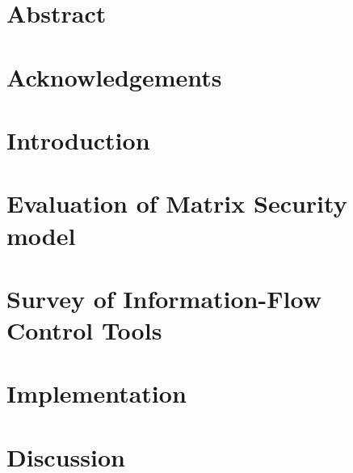




%




\setcounter{secnumdepth}{-1}
\frontmatter{}

\chapter{Abstract}


\chapter{Acknowledgements}


\pagebreak


\setcounter{tocdepth}{3}
\setcounter{secnumdepth}{3}

\tableofcontents*
\listoffigures
\listoftables







\mainmatter{}

\chapter{Introduction}\label{intro}


\chapter{Evaluation of Matrix Security model}\label{evaluationchapter}


\chapter{Survey of Information-Flow Control Tools} \label{surveychapter}


\chapter{Implementation}\label{implementation}


\chapter{Discussion}\label{discussion}


